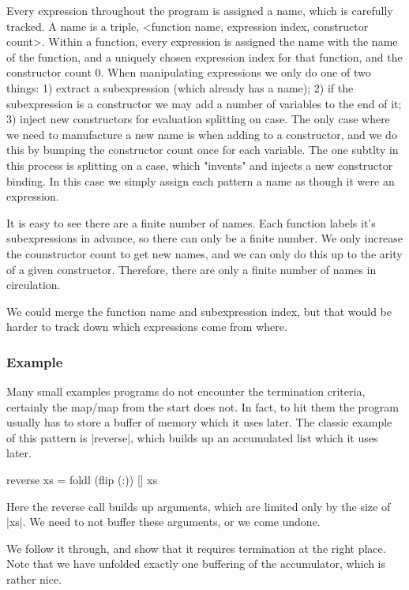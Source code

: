 \documentclass{sigplanconf}
\begin{document}
Every expression throughout the program is assigned a name, which is carefully tracked. A name is a triple, <function name, expression index, constructor count>. Within a function, every expression is assigned the name with the name of the function, and a uniquely chosen expression index for that function, and the constructor count 0. When manipulating expressions we only do one of two things: 1) extract a subexpression (which already has a name); 2) if the subexpression is a constructor we may add a number of variables to the end of it; 3) inject new constructors for evaluation splitting on case. The only case where we need to manufacture a new name is when adding to a constructor, and we do this by bumping the constructor count once for each variable. The one subtlty in this process is splitting on a case, which "invents" and injects a new constructor binding. In this case we simply assign each pattern a name as though it were an expression.

It is easy to see there are a finite number of names. Each function labels it's subexpressions in advance, so there can only be a finite number. We only increase the counstructor count to get new names, and we can only do this up to the arity of a given constructor. Therefore, there are only a finite number of names in circulation.

We could merge the function name and subexpression index, but that would be harder to track down which expressions come from where.

\subsubsection{Example}

Many small examples programs do not encounter the termination criteria, certainly the map/map from the start does not. In fact, to hit them the program usually has to store a buffer of memory which it uses later. The classic example of this pattern is |reverse|, which builds up an accumulated list which it uses later.

\begin{code}
reverse xs = foldl (flip (:)) [] xs
\end{code}

Here the reverse call builds up arguments, which are limited only by the size of |xs|. We need to not buffer these arguments, or we come undone.

We follow it through, and show that it requires termination at the right place. Note that we have unfolded exactly one buffering of the accumulator, which is rather nice.
\end{document}
